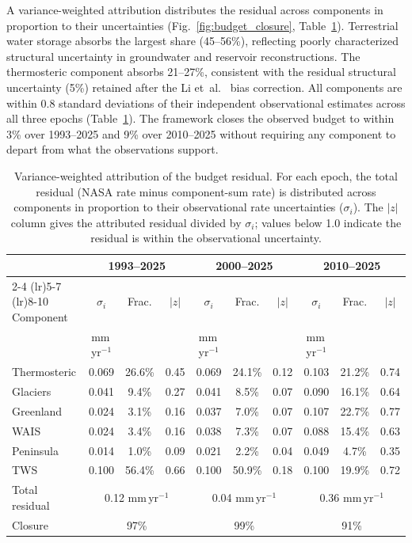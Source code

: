 \documentclass[12pt]{article}
\begin{document}
A variance-weighted attribution distributes the residual across components in proportion to their uncertainties (Fig.~\ref{fig:budget_closure}, Table~\ref{tab:attribution}). Terrestrial water storage absorbs the largest share (45--56\%), reflecting poorly characterized structural uncertainty in groundwater and reservoir reconstructions. The thermosteric component absorbs 21--27\%, consistent with the residual structural uncertainty (5\%) retained after the Li et~al.~\citep{Li2022} bias correction. All components are within 0.8 standard deviations of their independent observational estimates across all three epochs (Table~\ref{tab:attribution}). The framework closes the observed budget to within 3\% over 1993--2025 and 9\% over 2010--2025 without requiring any component to depart from what the observations support.

\begin{table}[h]
\centering
\caption{Variance-weighted attribution of the budget residual. For each epoch, the total residual (NASA rate minus component-sum rate) is distributed across components in proportion to their observational rate uncertainties ($\sigma_i$). The $|z|$ column gives the attributed residual divided by $\sigma_i$; values below 1.0 indicate the residual is within the observational uncertainty.}
\label{tab:attribution}
\begin{tabular}{l ccc ccc ccc}
\toprule
 & \multicolumn{3}{c}{1993--2025} & \multicolumn{3}{c}{2000--2025} & \multicolumn{3}{c}{2010--2025} \\
\cmidrule(lr){2-4} \cmidrule(lr){5-7} \cmidrule(lr){8-10}
Component & $\sigma_i$ & Frac. & $|z|$ & $\sigma_i$ & Frac. & $|z|$ & $\sigma_i$ & Frac. & $|z|$ \\
 & \multicolumn{1}{c}{\scriptsize mm\,yr$^{-1}$} & & & \multicolumn{1}{c}{\scriptsize mm\,yr$^{-1}$} & & & \multicolumn{1}{c}{\scriptsize mm\,yr$^{-1}$} & & \\
\midrule
Thermosteric  & 0.069 & 26.6\% & 0.45 & 0.069 & 24.1\% & 0.12 & 0.103 & 21.2\% & 0.74 \\
Glaciers      & 0.041 &  9.4\% & 0.27 & 0.041 &  8.5\% & 0.07 & 0.090 & 16.1\% & 0.64 \\
Greenland     & 0.024 &  3.1\% & 0.16 & 0.037 &  7.0\% & 0.07 & 0.107 & 22.7\% & 0.77 \\
WAIS          & 0.024 &  3.4\% & 0.16 & 0.038 &  7.3\% & 0.07 & 0.088 & 15.4\% & 0.63 \\
Peninsula     & 0.014 &  1.0\% & 0.09 & 0.021 &  2.2\% & 0.04 & 0.049 &  4.7\% & 0.35 \\
TWS           & 0.100 & 56.4\% & 0.66 & 0.100 & 50.9\% & 0.18 & 0.100 & 19.9\% & 0.72 \\
\midrule
Total residual & \multicolumn{3}{c}{0.12 mm\,yr$^{-1}$} & \multicolumn{3}{c}{0.04 mm\,yr$^{-1}$} & \multicolumn{3}{c}{0.36 mm\,yr$^{-1}$} \\
Closure        & \multicolumn{3}{c}{97\%} & \multicolumn{3}{c}{99\%} & \multicolumn{3}{c}{91\%} \\
\bottomrule
\end{tabular}
\end{table}
\end{document}
